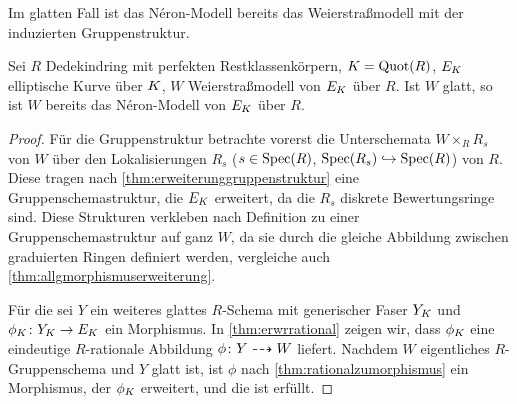 \documentclass[german, bibliography=totoc]{scrreprt}
\renewcommand*{\optcite}[2][]{}
\begin{document}
Im glatten Fall ist das Néron-Modell bereits das Weierstraßmodell mit
der induzierten Gruppenstruktur.
\begin{Korollar}\label{thm:neronmausweierstrassgl}
  \optcite[Corollary IV.6.3]{silverman2}
  Sei $R$ Dedekindring mit perfekten Restklassenkörpern, $K=\operatorname{Quot}(R)$,
  $E_{K}$ elliptische Kurve über $K$, $W$ Weierstraßmodell von $E_{K}$
  über $R$.
  Ist $W$ glatt, so ist $W$ bereits das Néron-Modell von $E_{K}$ über
  $R$.
  \begin{proof}
    Für die Gruppenstruktur betrachte vorerst die Unterschemata
    $W\times_R R_s$ von $W$ über den Lokalisierungen
    $R_s$ ($s\in\operatorname{Spec}(R)$, $\operatorname{Spec}(R_s)\hookrightarrow\operatorname{Spec}(R)$) von $R$.
    Diese tragen nach \ref{thm:erweiterunggruppenstruktur} eine
    Gruppenschemastruktur, die $E_{K}$ erweitert, da die $R_s$ diskrete
    Bewertungsringe sind.
    Diese Strukturen  verkleben nach Definition zu einer
    Gruppenschemastruktur auf ganz $W$, da sie durch die gleiche
    Abbildung zwischen graduierten Ringen definiert werden, vergleiche
    auch \ref{thm:allgmorphismuserweiterung}.

    Für die \NAbbEig sei $Y$ ein weiteres glattes $R$-Schema mit
    generischer Faser $Y_{K}$ und $\phi_{K}\colon Y_{K}\to E_{K}$ ein
    Morphismus.
    In \ref{thm:erwrrational} zeigen wir, dass $\phi_{K}$ eine
    eindeutige $R$-rationale Abbildung $\phi\colon Y\dashrightarrow W$ liefert.
    Nachdem $W$ eigentliches $R$-Gruppenschema und $Y$ glatt ist, ist
    $\phi$ nach \ref{thm:rationalzumorphismus} ein Morphismus, der
    $\phi_{K}$ erweitert, und die \NAbbEig ist erfüllt.
  \end{proof}
\end{Korollar}
\end{document}
